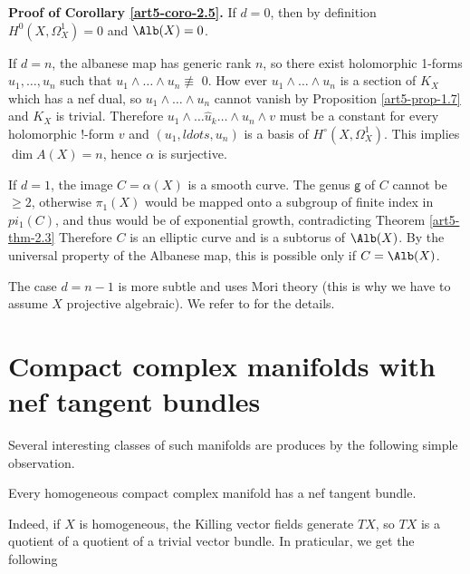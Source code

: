 \noindent
\textbf{Proof of Corollary \ref{art5-coro-2.5}.}
If $d=0$, then by definition $H^{0}(X, \Omega_{X}^{1}) = 0$ and $\Alb(X) = {0}$.

If $d=n$, the albanese map has generic rank $n$, so there exist holomorphic 1-forms $u_{1}, \ldots, u_{n}$ such that $u_{1}\wedge \ldots \wedge u_{n} \nequiv$ 0. How ever $u_{1}\wedge \ldots \wedge u_{n}$ is a section of $K_{X}$ which has a nef dual, so $u_{1} \wedge \ldots \wedge u_{n}$ cannot vanish by Proposition \ref{art5-prop-1.7} and $K_{X}$ is trivial. Therefore $u_{1} \wedge \ldots \hat{u}_{k}\ldots \wedge u_{n} \wedge v$ must be a constant for every holomorphic !-form $v$ and $(u_{1}, ldots, u_{n})$ is a basis of $H^{\circ}(X, \Omega_{X}^{1})$. This implies $\dim A(X)= n$, hence $\alpha$ is surjective.

If $d =1$, the image $C=\alpha(X)$ is a smooth curve. The genus $\mathsf{g}$ of $C$ cannot be $\geq 2$, otherwise $\pi_{1}(X)$ would be mapped onto a subgroup of finite index in $pi_{1}(C)$, and thus would be of exponential growth, contradicting Theorem \ref{art5-thm-2.3} Therefore $C$ is an elliptic curve and is a subtorus of $\Alb(X)$. By the universal property of the Albanese map, this is possible only if $C= \Alb(X)$.

The case $d =n-1$ is more subtle and uses Mori theory (this is why we have to assume $X$ projective algebraic). We refer to \cite{art5-keyDPS92} for the details.

\section{Compact complex manifolds with nef tangent bundles}\label{art5-sec-3}

Several interesting classes of such manifolds are produces by the following simple observation.

\begin{prop}\label{art5-prop-3.1}
Every homogeneous compact complex manifold has a nef tangent bundle.
\end{prop}

Indeed, if $X$ is homogeneous, the Killing vector fields generate $TX$, so $TX$ is a quotient of a quotient of a trivial vector bundle. In praticular, we get the following

